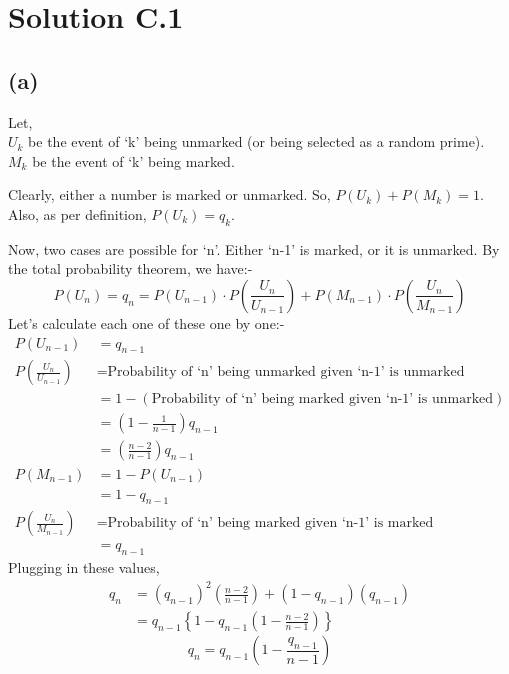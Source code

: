 \documentclass{article}
\begin{document}
\section*{Solution C.1}
\subsection*{(a)}
Let, \\
$U_{k}$ be the event of `k' being unmarked (or being selected as a random prime). \\
$M_{k}$ be the event of `k' being marked.
\medskip

\noindent
Clearly, either a number is marked or unmarked. So, $P(U_{k})+P(M_{k})=1$. \\
Also, as per definition, $P(U_{k})=q_k$.
\medskip

\noindent
Now, two cases are possible for `n'. Either `n-1' is marked, or it is unmarked. By the total probability theorem, we have:-
\[P(U_{n})=q_n=P(U_{n-1})\cdot P\left(\frac{U_n}{U_{n-1}}\right)+P\left(M_{n-1}\right)\cdot P\left(\frac{U_n}{M_{n-1}}\right)\]
Let's calculate each one of these one by one:-
\begin{align*}
    P(U_{n-1})&=q_{n-1} \\
    P\left(\frac{U_n}{U_{n-1}}\right)&= \text{Probability of `n' being unmarked given `n-1' is unmarked} \\
                          &= 1 - (\text{Probability of `n' being marked given `n-1' is unmarked}) \\
                          &= \left(1-\frac{1}{n-1}\right)q_{n-1} \\
                          &= \left(\frac{n-2}{n-1}\right)q_{n-1} \\
    P(M_{n-1})&=1-P(U_{n-1}) \\
              &= 1- q_{n-1} \\
    P\left(\frac{U_{n}}{M_{n-1}}\right)&=\text{Probability of `n' being marked given `n-1' is marked} \\
                                       &= q_{n-1}
\end{align*}
Plugging in these values,
\begin{align*}
q_{n} &= {\left(q_{n-1}\right)}^2\left(\frac{n-2}{n-1}\right) + \left(1-q_{n-1}\right)(q_{n-1})\\
          &= q_{n-1}\left\{1-q_{n-1}\left(1-\frac{n-2}{n-1}\right)\right\}
\end{align*}
\[\boxed{q_n=q_{n-1}\left(1-\frac{q_{n-1}}{n-1}\right)}\]
\end{document}
